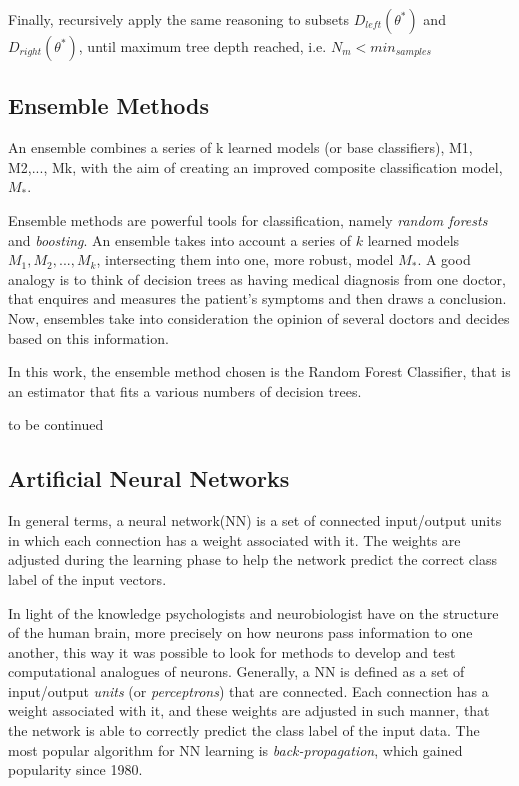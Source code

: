 Finally, recursively apply the same reasoning to subsets $D_{left}(\theta^*)$ and $D_{right}(\theta^*)$, until maximum tree depth reached, i.e. $N_m < min_{samples}$ \cite{DTform}

\subsection{Ensemble Methods}

An ensemble combines a series of k learned models (or base classifiers), M1, M2,..., Mk, with the aim of creating an improved composite classification model, $M_{*}$.  

Ensemble methods are powerful tools for classification, namely \textit{random forests} and \textit{boosting}. An ensemble takes into account a series of $k$ learned models $M_1, M_2,...,M_k$, intersecting them into one,  more robust, model $M_*$. A good analogy is to think of decision trees as having medical diagnosis from one doctor, that enquires and measures the patient's symptoms and then draws a conclusion. Now, ensembles take into consideration the opinion of several doctors and decides based on this information. 

In this work, the ensemble method chosen is the Random Forest Classifier, that is an estimator that fits a various numbers of decision trees. \cite{HanDataMining}

to be continued

\subsection{Artificial Neural Networks}

In general terms, a neural network(NN) is a set of connected input/output units in which each connection has a weight associated with it. The weights are adjusted during the learning phase to help the network predict the correct class label of the input vectors.

In light of the knowledge psychologists and neurobiologist have on the structure of the human brain, more precisely on how neurons pass information to one another, this way it was possible to look for methods to develop and test computational analogues of neurons. Generally, a NN is defined as a set of input/output \textit{units} (or \textit{perceptrons}) that are connected. Each connection has a weight associated with it, and these weights are adjusted in such manner, that the network is able to correctly predict the class label of the input data. The most popular algorithm for NN learning is \textit{back-propagation}, which gained popularity since 1980. \cite{HanDataMining}

